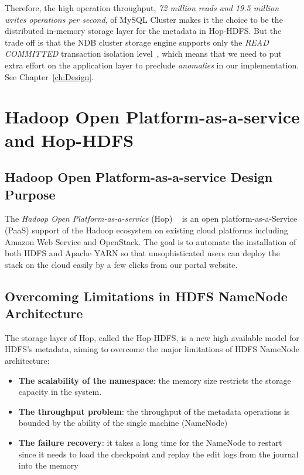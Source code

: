 \noindent Therefore, the high operation throughput, \textit{72 million reads and 19.5 million writes operations per second}, of MySQL Cluster makes it the choice to be the distributed in-memory storage layer for the metadata in Hop-HDFS. But the trade off is that the NDB cluster storage engine supports only the \textit{READ COMMITTED} transaction isolation level~\cite{mysqlreadcommited}, which means that we need to put extra effort on the application layer to preclude \textit{anomalies} in our implementation. See Chapter~\ref{ch:Design}.

\section{Hadoop Open Platform-as-a-service and Hop-HDFS}
\label{sc:Hop-HDFS}
\subsection{Hadoop Open Platform-as-a-service Design Purpose}
The \textit{Hadoop Open Platform-as-a-service} (Hop) ~\cite{hop} is an open platform-as-a-Service (PaaS) support of the Hadoop ecosystem on existing cloud platforms including Amazon Web Service and OpenStack. The goal is to automate the installation of both HDFS and Apache YARN so that unsophisticated users can deploy the stack on the cloud easily by a few clicks from our portal website. 

\subsection{Overcoming Limitations in HDFS NameNode Architecture}

\noindent The storage layer of Hop, called the Hop-HDFS, is a new high available model for HDFS's metadata, aiming to overcome the major limitations of HDFS NameNode architecture:

\begin{itemize}[noitemsep]
	\item \textbf{The scalability of the namespace}: the memory size restricts the storage capacity in the system.
	\item \textbf{The throughput problem}: the throughput of the metadata operations is bounded by the ability of the single machine (NameNode)
	\item \textbf{The failure recovery}: it takes a long time for the NameNode to restart since it needs to load the checkpoint and replay the edit logs from the journal into the memory
\end{itemize}

